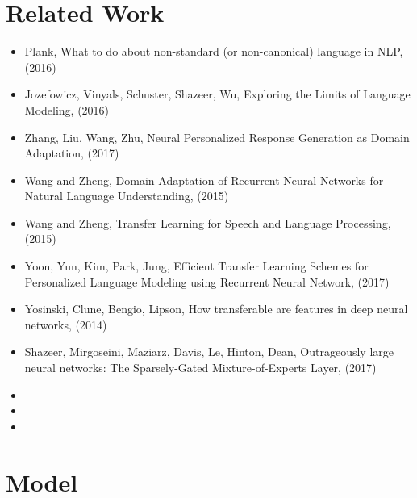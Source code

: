 \documentclass[12pt,letterpaper]{article}
\theoremstyle{remark}
\theoremstyle{plain}
\begin{document}








\section{Related Work}

\begin{itemize}
\item Plank, What to do about non-standard (or non-canonical) language in NLP, (2016)
\item Jozefowicz, Vinyals, Schuster, Shazeer, Wu, Exploring the Limits of Language Modeling, (2016)
\item Zhang, Liu, Wang, Zhu, Neural Personalized Response Generation as Domain Adaptation, (2017) 
\item Wang and Zheng, Domain Adaptation of Recurrent Neural Networks for Natural Language Understanding, (2015) 
\item Wang and Zheng, Transfer Learning for Speech and Language Processing, (2015)
\item Yoon, Yun, Kim, Park, Jung, Efficient Transfer Learning Schemes for Personalized Language Modeling using Recurrent Neural Network, (2017)
\item Yosinski, Clune, Bengio, Lipson, How transferable are features in deep neural networks, (2014)
\item Shazeer, Mirgoseini, Maziarz, Davis, Le, Hinton, Dean, Outrageously large neural networks: The Sparsely-Gated Mixture-of-Experts Layer, (2017)
\item 
\item 
\item 
\end{itemize}








\section{Model}
\end{document}
